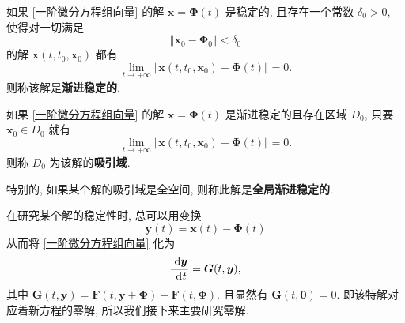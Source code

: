 \begin{definition}
	如果 \eqref{一阶微分方程组向量} 的解 $\bm x=\bm\Phi(t)$ 是稳定的, 且存在一个常数 $\delta_0>0$, 使得对一切满足 \begin{equation}
		\Vert \bm x_0 -\bm\Phi_0\Vert<\delta_0
	\end{equation} 的解 $\bm x(t,t_0,\bm x_0)$ 都有 \begin{equation}
	\lim\limits_{t\to+\infty}\Vert \bm x(t,t_0,\bm x_0)-\bm\Phi(t)\Vert=0.
	\end{equation}
	则称该解是\textbf{渐进稳定的}.
\end{definition}

\begin{definition}
	如果 \eqref{一阶微分方程组向量} 的解 $\bm x=\bm\Phi(t)$ 是渐进稳定的且存在区域 $D_0$, 只要 $\bm x_0\in D_0$ 就有 $$
	\lim\limits_{t\to+\infty}\Vert \bm x(t,t_0,\bm x_0)-\bm\Phi(t)\Vert=0.$$ 则称 $D_0$ 为该解的\textbf{吸引域}.

	特别的, 如果某个解的吸引域是全空间, 则称此解是\textbf{全局渐进稳定的}.
\end{definition}

\begin{remark}
	在研究某个解的稳定性时, 总可以用变换 \begin{equation}
		\bm y(t)=\bm x(t)-\bm\Phi(t)
	\end{equation} 从而将 \eqref{一阶微分方程组向量} 化为 \begin{equation}
	\dfrac{\ \text {d} \bm y^{}}{\ \text {d}^{} t}=\bm G(t,\bm y),
	\end{equation}
	其中 $\bm G(t,\bm y)=\bm F(t,\bm y+\bm\Phi)-\bm F(t,\bm\Phi)$.
	且显然有 $\bm G(t,\bm 0)=0$. 即该特解对应着新方程的零解, 所以我们接下来主要研究零解.
\end{remark}


